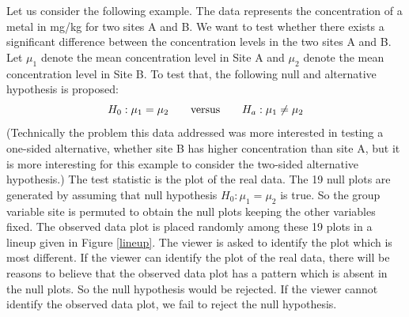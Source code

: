 \documentclass[12]{article}
\begin{document}
Let us consider the following example. The data represents the concentration of a metal in mg/kg for two sites A and B.
We want to test whether there exists a significant difference between the concentration levels in the two sites A and B. Let $\mu_1$ denote the mean concentration level in Site A and $\mu_2$ denote the mean concentration level in Site B. To test that, the following null and alternative hypothesis is proposed:
\[
H_0: \mu_1 = \mu_2 \qquad \hbox{versus} \qquad H_a: \mu_1 \ne \mu_2
\]
(Technically the problem this data addressed was more interested in testing a one-sided alternative, whether site B has higher concentration than site A, but it is more interesting for this example to consider the two-sided alternative hypothesis.) The test statistic is the plot of the real data. The 19 null plots are generated by assuming that null hypothesis $H_0: \mu_1 =  \mu_2$ is true. So the group variable site is permuted to obtain the null plots keeping the other variables fixed. The observed data plot is placed randomly among these 19 plots in a lineup given in Figure \ref{lineup}. The viewer is asked to identify the plot which is most different. If the viewer can identify the plot of the real data, there will be reasons to believe that the observed data plot has a pattern which is absent in the null plots. So the null hypothesis would be rejected. If the viewer cannot identify the observed data plot, we fail to reject the null hypothesis. 
\end{document}
